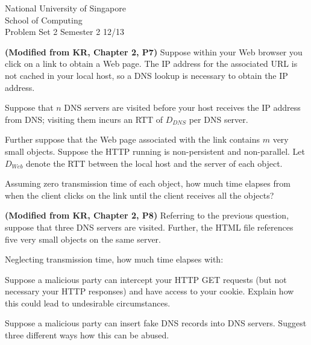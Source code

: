 \documentclass[a4paper,11pt]{exam}
\begin{document}
\extraheadheight{.5in}
%
{\large\sf National University of Singapore\\ School of Computing \\
\LARGE\sf Problem Set 2}%
{\large\sf Semester 2 12/13}
\firstpageheadrule
\pagestyle{headandfoot}

\begin{questions}

\question \textbf{(Modified from KR, Chapter 2, P7)}
Suppose within your Web browser you click on a link to obtain a
Web page.  The IP address for the associated URL is not cached
in your local host, so a DNS lookup is necessary to obtain the
IP address.  

Suppose that $n$ DNS servers are visited before your
host receives the IP address from DNS; visiting them incurs 
an RTT of $D_{DNS}$ per DNS server.

Further suppose that
the Web page associated with the link contains $m$ very small objects. 
Suppose the HTTP running is non-persistent and non-parallel.  Let 
$D_{Web}$
denote the RTT between the local host and the server of each
object.  

Assuming zero transmission time of each object, how
much time elapses from when the client clicks on the link until
the client receives all the objects?

\question \textbf{(Modified from KR, Chapter 2, P8)}
Referring to the previous question, suppose that three DNS servers are visited.  Further, the HTML file
references five very small objects on the same server.

Neglecting transmission time, how much time elapses with:

\question 
Suppose a malicious party can intercept your HTTP GET requests (but not necessary your HTTP responses) and have access to your cookie.  Explain how this could lead to undesirable circumstances.

\question
Suppose a malicious party can insert fake DNS records into DNS servers.  Suggest three different ways how this can be abused.

\end{questions}
\end{document}
